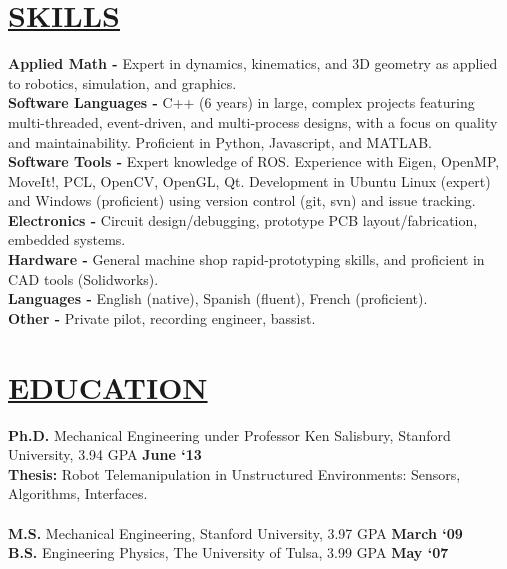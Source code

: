 \documentclass[line,margin]{res}
\begin{document}
\begin{resume}
\section{\underline{SKILLS}}
\vspace{1.0pc}
\textbf{Applied Math -} Expert in dynamics, kinematics, and 3D geometry as applied to robotics, simulation, and graphics.
\\[0.0pc]\textbf{Software Languages -} C++ (6 years) in large, complex projects featuring multi-threaded, event-driven, and multi-process designs, with a focus on quality and maintainability. Proficient in Python, Javascript, and MATLAB.
\\[0.0pc]\textbf{Software Tools -}
Expert knowledge of ROS. Experience with Eigen, OpenMP, MoveIt!, PCL, OpenCV, OpenGL, Qt.
Development in Ubuntu Linux (expert) and Windows (proficient)
using version control (git, svn) and issue tracking.
\\[0.0pc]\textbf{Electronics -} Circuit design/debugging, prototype PCB layout/fabrication, embedded systems.
\\[0.0pc]\textbf{Hardware -} General machine shop rapid-prototyping skills, and proficient in CAD tools (Solidworks).
\\[0.0pc]\textbf{Languages -} English (native), Spanish (fluent), French (proficient).
\\[0.0pc]\textbf{Other -} Private pilot, recording engineer, bassist.
%
%
\section{\underline{EDUCATION}}
\vspace{1.0pc}
\textbf{Ph.D.} Mechanical Engineering under Professor Ken Salisbury, Stanford University, 3.94 GPA
\hfill \textbf{June `13}%
{ {\small
\\[0.0pc]{\bf Thesis:} Robot Telemanipulation in Unstructured Environments: Sensors, Algorithms, Interfaces.
\\[-0.6pc]} }
%
\\[0.0pc]\textbf{M.S.} Mechanical Engineering, Stanford University, 3.97 GPA \hfill  \textbf{March `09}
\\[0.0pc]\textbf{B.S.} Engineering Physics, The University of Tulsa, 3.99 GPA \hfill \textbf{May `07}
%


\end{resume}
\end{document}
